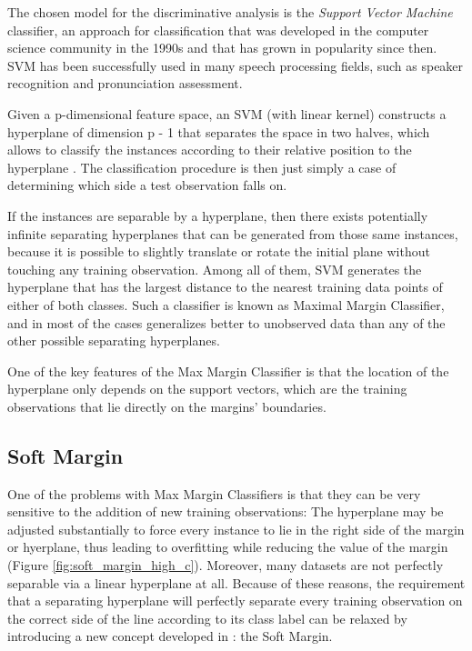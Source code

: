 
The chosen model for the discriminative analysis is the \textit{Support Vector Machine} classifier,
an approach for classification that was developed in the computer science community in the 1990s
and that has grown in popularity since then. SVM has been successfully used in many
speech processing fields, such as speaker recognition and pronunciation assessment.

Given a p-dimensional feature space, an SVM (with linear kernel)
constructs a hyperplane of dimension p - 1
that separates the space in two halves, which allows to classify the instances according
to their relative position to the hyperplane \cite{svm_jwht}. The classification
procedure is then just simply a case of determining which side a test observation falls on.

If the instances are separable by a hyperplane, then there exists potentially infinite
separating hyperplanes that can be generated from those same instances, because it
is possible to slightly translate or rotate the initial plane without touching any training
observation. Among all of them, SVM generates the hyperplane that has the largest
distance to the nearest training data points of either of both classes. Such a classifier
is known as Maximal Margin Classifier, and in most of the cases generalizes better to
unobserved data than any of the other possible separating hyperplanes.

One of the key features of the Max Margin Classifier is that the location of the hyperplane
only depends on the support vectors, which are the training observations that lie directly
on the margins' boundaries.

\subsection{Soft Margin} \label{subsection:soft_margin}

One of the problems with Max Margin Classifiers is that they can be very sensitive to the
addition of new training observations: The hyperplane may be adjusted substantially
to force every instance to lie in the right side of the margin or hyerplane, thus leading
to overfitting while reducing the value of the margin (Figure \ref{fig:soft_margin_high_c}).
Moreover, many datasets are not perfectly separable via a linear hyperplane at all.
Because of these reasons, the requirement that a separating hyperplane will perfectly separate
every training observation on the correct side of the line according to its class label can
be relaxed by introducing a new concept developed in \cite{svm_soft_margin}: the Soft Margin.

